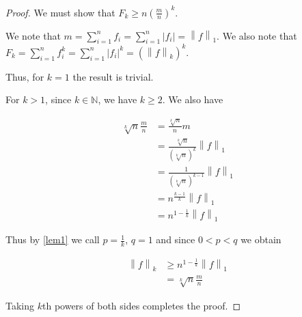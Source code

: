 \documentclass[11pt]{amsart}
\newcommand{\norm}[1]{\left\lVert #1 \right\rVert}
\begin{document}
\begin{proof}
We must show that $F_k \ge n \left(\frac{m}{n}\right)^k$.

We note that $m = \sum_{i=1}^n f_i = \sum_{i=1}^n |f_i| = \norm{f}_1$. We also note that $F_k = \sum_{i=1}^n f_i^k = \sum_{i=1}^n |f_i|^k = \left(\norm{f}_k\right)^k$.

Thus, for $k = 1$ the result is trivial.

For $k > 1$, since $k \in \mathbb{N}$, we have $k \ge 2$. We also have

\begin{align*}
\sqrt[k]{n} \frac{m}{n} &= \frac{\sqrt[k]{n}}{n} m\\
                        &= \frac{\sqrt[k]{n}}{\left(\sqrt[k]{n}\right)^k} \norm{f}_1\\
                        &= \frac{1}{\left(\sqrt[k]{n}\right)^{k-1}} \norm{f}_1\\
                        &= n^{\frac{k-1}{k}} \norm{f}_1\\
                        &= n^{1 - \frac{1}{k}} \norm{f}_1
\end{align*}

Thus by \ref{lem1} we call $p = \frac{1}{k}$, $q = 1$ and since $0 < p < q$ we obtain

\begin{align*}
\norm{f}_k &\ge n^{1 - \frac{1}{k}} \norm{f}_1\\
           &= \sqrt[k]{n} \frac{m}{n}
\end{align*}

Taking $k$th powers of both sides completes the proof.
\end{proof}
\end{document}

